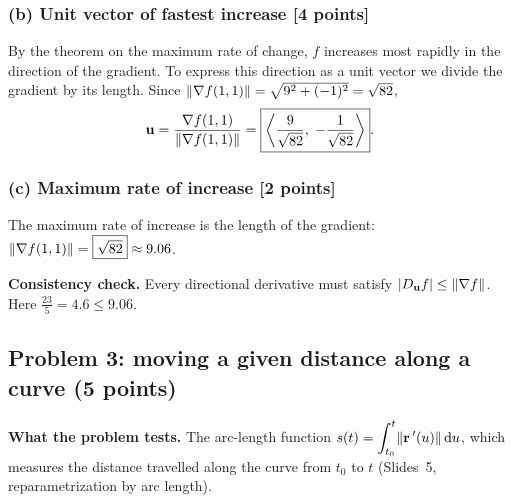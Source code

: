 \subsubsection*{(b) Unit vector of fastest increase [4 points]}

By the theorem on the maximum rate of change, $f$ increases most rapidly in the
direction of the gradient. To express this direction as a unit vector we divide
the gradient by its length. Since $\lVert\nabla f(1,1)\rVert=\sqrt{9^2+(-1)^2}=\sqrt{82}$,
\[
  \mathbf{u}=\frac{\nabla f(1,1)}{\lVert\nabla f(1,1)\rVert}=\boxed{\left\langle \frac{9}{\sqrt{82}},\;-\frac{1}{\sqrt{82}} \right\rangle}.
\]

\subsubsection*{(c) Maximum rate of increase [2 points]}

The maximum rate of increase is the length of the gradient:
$\lVert\nabla f(1,1)\rVert=\boxed{\sqrt{82}}\approx9.06$.

\textbf{Consistency check.} Every directional derivative must satisfy
$\lvert D_{\mathbf{u}} f\rvert\le\lVert\nabla f\rVert$. Here $\frac{23}{5}=4.6\le9.06$.\checkok



\subsection{Problem 3: moving a given distance along a curve (5 points)}

\textbf{What the problem tests.} The arc-length function
$s(t)=\displaystyle\int_{t_0}^{t}\lVert\mathbf{r}\,'(u)\rVert\,\mathrm{d} u$, which measures the distance travelled
along the curve from $t_0$ to $t$ (Slides~5, reparametrization by arc length).

